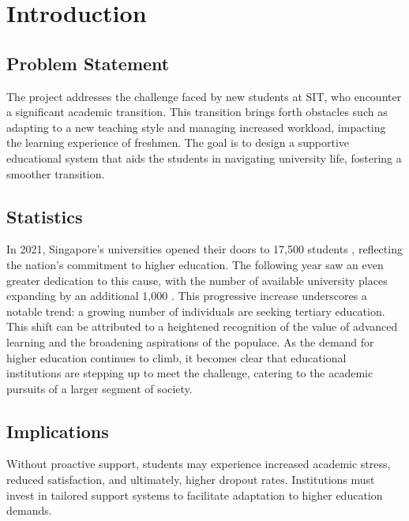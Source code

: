 \chapter{Introduction}\label{introduction}

\section{Problem Statement}\label{problem_statement}
The project addresses the challenge faced by new students at SIT, who encounter a significant academic transition. This transition brings forth obstacles such as adapting to a new teaching style and managing increased workload, impacting the learning experience of freshmen. The goal is to design a supportive educational system that aids the students in navigating university life, fostering a smoother transition.

\section{Statistics}\label{statistics}

In 2021, Singapore's universities opened their doors to 17,500 students \cite{Davie_2021}, reflecting the nation's commitment to higher education. The following year saw an even greater dedication to this cause, with the number of available university places expanding by an additional 1,000 \cite{Davie_2023}. This progressive increase underscores a notable trend: a growing number of individuals are seeking tertiary education. This shift can be attributed to a heightened recognition of the value of advanced learning and the broadening aspirations of the populace. As the demand for higher education continues to climb, it becomes clear that educational institutions are stepping up to meet the challenge, catering to the academic pursuits of a larger segment of society.

\section{Implications}\label{implications}
Without proactive support, students may experience increased academic stress, reduced satisfaction, and ultimately, higher dropout rates. Institutions must invest in tailored support systems to facilitate adaptation to higher education demands.

